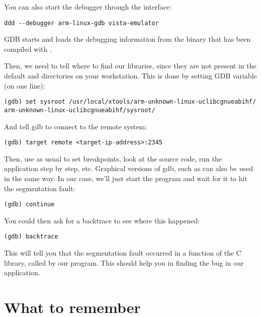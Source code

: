 You can also start the debugger through the  interface:
\begin{verbatim}
ddd --debugger arm-linux-gdb vista-emulator
\end{verbatim}

GDB starts and loads the debugging information from the
 binary that has been compiled with .

Then, we need to tell where to find our libraries, since they are not
present in the default  and  directories on
your workstation. This is done by setting GDB  variable
(on one line):

\begin{verbatim}
(gdb) set sysroot /usr/local/xtools/arm-unknown-linux-uclibcgnueabihf/
arm-unknown-linux-uclibcgnueabihf/sysroot/
\end{verbatim}

And tell gdb to connect to the remote system:
\begin{verbatim}
(gdb) target remote <target-ip-address>:2345
\end{verbatim}

Then, use  as usual to set breakpoints, look at the source
code, run the application step by step, etc. Graphical versions of
gdb, such as  can also be used in the same way. In our case,
we'll just start the program and wait for it to hit the segmentation
fault:
\begin{verbatim}
(gdb) continue
\end{verbatim}

You could then ask for a backtrace to see where this happened:
\begin{verbatim}
(gdb) backtrace
\end{verbatim}

This will tell you that the segmentation fault occurred in a function
of the C library, called by our program. This should help you in
finding the bug in our application.

\section{What to remember}

